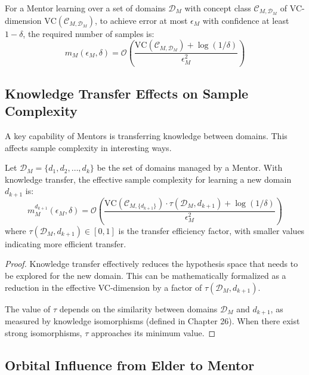 \begin{theorem}
For a Mentor learning over a set of domains $\mathcal{D}_M$ with concept class $\mathcal{C}_{M,\mathcal{D}_M}$ of VC-dimension $\text{VC}(\mathcal{C}_{M,\mathcal{D}_M})$, to achieve error at most $\epsilon_{M}$ with confidence at least $1-\delta$, the required number of samples is:
\begin{equation}
m_{M}(\epsilon_{M}, \delta) = \mathcal{O}\left(\frac{\text{VC}(\mathcal{C}_{M,\mathcal{D}_M}) + \log(1/\delta)}{\epsilon_{M}^2}\right)
\end{equation}
\end{theorem}

\subsection{Knowledge Transfer Effects on Sample Complexity}

A key capability of Mentors is transferring knowledge between domains. This affects sample complexity in interesting ways.

\begin{theorem}
Let $\mathcal{D}_M = \{d_1, d_2, \ldots, d_k\}$ be the set of domains managed by a Mentor. With knowledge transfer, the effective sample complexity for learning a new domain $d_{k+1}$ is:
\begin{equation}
m_{M}^{d_{k+1}}(\epsilon_{M}, \delta) = \mathcal{O}\left(\frac{\text{VC}(\mathcal{C}_{M,\{d_{k+1}\}}) \cdot \tau(\mathcal{D}_M, d_{k+1}) + \log(1/\delta)}{\epsilon_{M}^2}\right)
\end{equation}
where $\tau(\mathcal{D}_M, d_{k+1}) \in [0, 1]$ is the transfer efficiency factor, with smaller values indicating more efficient transfer.
\end{theorem}

\begin{proof}
Knowledge transfer effectively reduces the hypothesis space that needs to be explored for the new domain. This can be mathematically formalized as a reduction in the effective VC-dimension by a factor of $\tau(\mathcal{D}_M, d_{k+1})$.

The value of $\tau$ depends on the similarity between domains $\mathcal{D}_M$ and $d_{k+1}$, as measured by knowledge isomorphisms (defined in Chapter 26). When there exist strong isomorphisms, $\tau$ approaches its minimum value.
\end{proof}

\subsection{Orbital Influence from Elder to Mentor}


